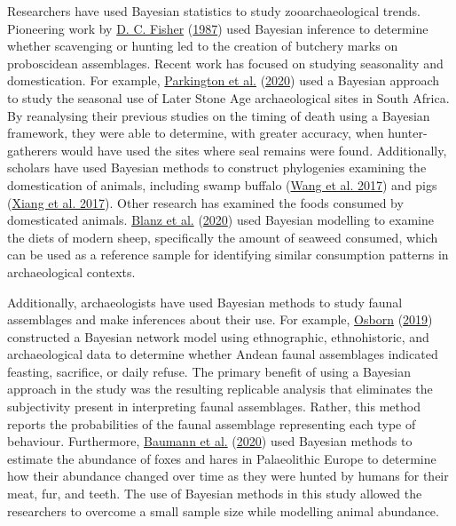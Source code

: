 \documentclass[
]{article}
\begin{document}
Researchers have used Bayesian statistics to study zooarchaeological
trends. Pioneering work by
\protect\hyperlink{ref-fisher_mastodont_1987}{D. C. Fisher}
(\protect\hyperlink{ref-fisher_mastodont_1987}{1987}) used Bayesian
inference to determine whether scavenging or hunting led to the creation
of butchery marks on proboscidean assemblages. Recent work has focused
on studying seasonality and domestication. For example,
\protect\hyperlink{ref-parkington_contemporaneity_2020}{Parkington et
al.} (\protect\hyperlink{ref-parkington_contemporaneity_2020}{2020})
used a Bayesian approach to study the seasonal use of Later Stone Age
archaeological sites in South Africa. By reanalysing their previous
studies on the timing of death using a Bayesian framework, they were
able to determine, with greater accuracy, when hunter-gatherers would
have used the sites where seal remains were found. Additionally,
scholars have used Bayesian methods to construct phylogenies examining
the domestication of animals, including swamp buffalo
(\protect\hyperlink{ref-wang_whole_2017}{Wang et al. 2017}) and pigs
(\protect\hyperlink{ref-xiang_origin_2017}{Xiang et al. 2017}). Other
research has examined the foods consumed by domesticated animals.
\protect\hyperlink{ref-blanz_identifying_2020}{Blanz et al.}
(\protect\hyperlink{ref-blanz_identifying_2020}{2020}) used Bayesian
modelling to examine the diets of modern sheep, specifically the amount
of seaweed consumed, which can be used as a reference sample for
identifying similar consumption patterns in archaeological contexts.

Additionally, archaeologists have used Bayesian methods to study faunal
assemblages and make inferences about their use. For example,
\protect\hyperlink{ref-osborn_bayesian_2019}{Osborn}
(\protect\hyperlink{ref-osborn_bayesian_2019}{2019}) constructed a
Bayesian network model using ethnographic, ethnohistoric, and
archaeological data to determine whether Andean faunal assemblages
indicated feasting, sacrifice, or daily refuse. The primary benefit of
using a Bayesian approach in the study was the resulting replicable
analysis that eliminates the subjectivity present in interpreting faunal
assemblages. Rather, this method reports the probabilities of the faunal
assemblage representing each type of behaviour. Furthermore,
\protect\hyperlink{ref-baumann_role_2020}{Baumann et al.}
(\protect\hyperlink{ref-baumann_role_2020}{2020}) used Bayesian methods
to estimate the abundance of foxes and hares in Palaeolithic Europe to
determine how their abundance changed over time as they were hunted by
humans for their meat, fur, and teeth. The use of Bayesian methods in
this study allowed the researchers to overcome a small sample size while
modelling animal abundance.
\end{document}
